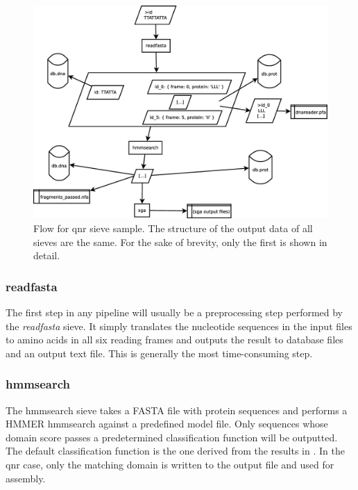 \documentclass[a4paper,12pt]{article}
\begin{document}
\begin{figure}[h]
\includegraphics[width=\textwidth, keepaspectratio=true]{flow}
\caption{Flow for qnr sieve sample. The structure of the output data of all sieves are the same. For the sake of brevity, only the first is shown in detail.}
\label{fig:qnrflow}
\end{figure}

\subsubsection{readfasta}
The first step in any pipeline will usually be a preprocessing step performed by the \emph{readfasta} sieve. It simply translates the nucleotide sequences in the input files to amino acids in all six reading frames and outputs the result to database files and an output text file. This is generally the most time-consuming step.

\subsubsection{hmmsearch}
The hmmsearch sieve takes a FASTA file with protein sequences and performs a HMMER hmmsearch against a predefined model file. Only sequences whose domain score passes a predetermined classification function will be outputted. The default classification function is the one derived from the results in \cite{Boulund}. In the qnr case, only the matching domain is written to the output file and used for assembly.
\end{document}
